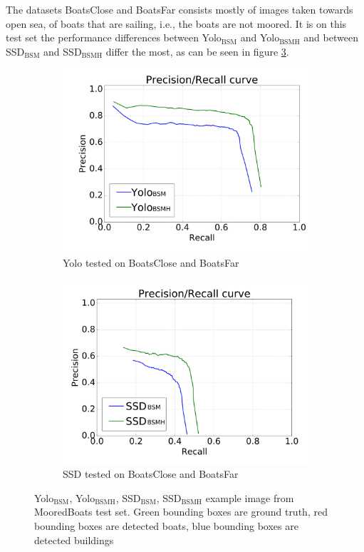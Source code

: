 The datasets BoatsClose and BoatsFar consists mostly of images taken towards open sea, of boats that are sailing, i.e., the boats are not moored. It is on this  test set the performance differences between Yolo$_{\text{BSM}}$ and Yolo$_{\text{BSMH}}$ and between SSD$_{\text{BSM}}$ and SSD$_{\text{BSMH}}$ differ the most, as can be seen in figure \ref{fig:bcbf_prec}.

\begin{figure}[h!]
\begin{subfigure}{.5\textwidth}
  \centering
  \includegraphics[width=0.8\linewidth]{results/case_buildings/prec_recall/yolo/bcbf-eps.png}
  \caption{Yolo tested on BoatsClose and BoatsFar}
  \label{fig:ex_bcbf_prec_rec_yolo}
\end{subfigure}%
\begin{subfigure}{.5\textwidth}
  \centering
  \includegraphics[width=.8\linewidth]{results/case_buildings/prec_recall/ssd/bcbf-eps.png}
  \caption{SSD tested on BoatsClose and BoatsFar}
  \label{fig:ex_bcbf_prec_rec_ssd}
\end{subfigure}
\caption{Yolo$_{\text{BSM}}$, Yolo$_{\text{BSMH}}$, SSD$_{\text{BSM}}$, SSD$_{\text{BSMH}}$ example image from MooredBoats test set. Green bounding boxes are ground truth, red bounding boxes are detected boats, blue bounding boxes are detected buildings}
\label{fig:bcbf_prec}
\end{figure}

